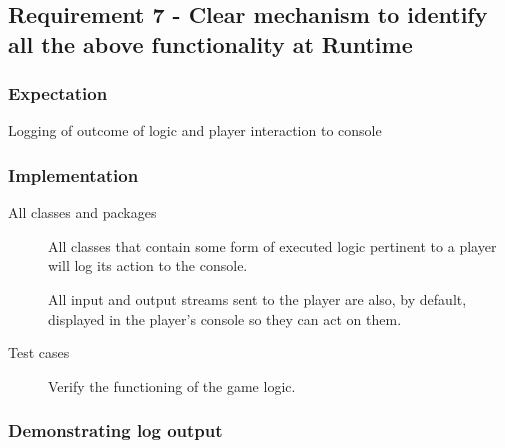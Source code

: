 \subsection{Requirement 7 - Clear mechanism to identify all the above functionality at Runtime} 

\subsubsection{Expectation} 
 Logging of outcome of logic and player interaction to console

\subsubsection{Implementation}

\begin{description}
	\item[All classes and packages] All classes that contain some form of executed logic pertinent to a player will log its action to the console. 
	
	All input and output streams sent to the player are also, by default, displayed in the player's console so they can act on them.
	
	\item[Test cases] Verify the functioning of the game logic.
\end{description}

\subsubsection{Demonstrating log output} 




 


 


 
